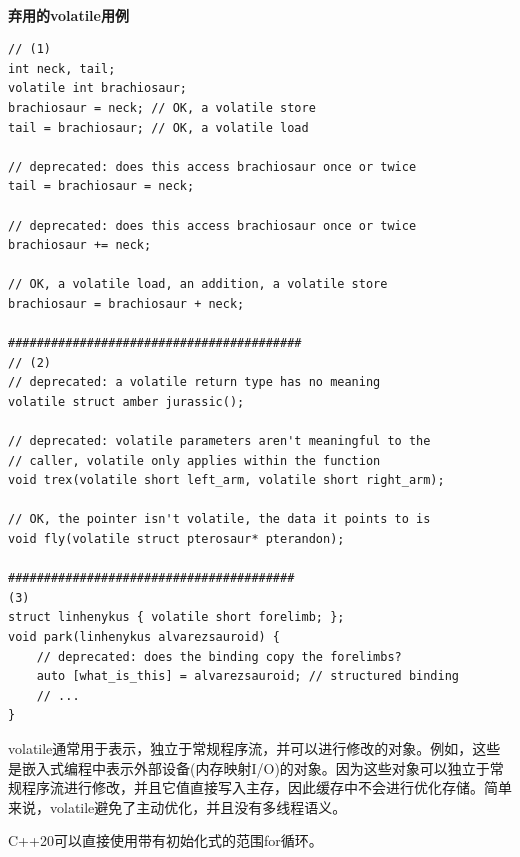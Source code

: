 \hspace*{\fill} \\ %
\noindent
\textbf{弃用的volatile用例}
\begin{lstlisting}[style=styleCXX]
// (1)
int neck, tail;
volatile int brachiosaur;
brachiosaur = neck; // OK, a volatile store
tail = brachiosaur; // OK, a volatile load

// deprecated: does this access brachiosaur once or twice
tail = brachiosaur = neck;

// deprecated: does this access brachiosaur once or twice
brachiosaur += neck;

// OK, a volatile load, an addition, a volatile store
brachiosaur = brachiosaur + neck;

#########################################
// (2)
// deprecated: a volatile return type has no meaning
volatile struct amber jurassic();

// deprecated: volatile parameters aren't meaningful to the
// caller, volatile only applies within the function
void trex(volatile short left_arm, volatile short right_arm);

// OK, the pointer isn't volatile, the data it points to is
void fly(volatile struct pterosaur* pterandon);

########################################
(3)
struct linhenykus { volatile short forelimb; };
void park(linhenykus alvarezsauroid) {
	// deprecated: does the binding copy the forelimbs?
	auto [what_is_this] = alvarezsauroid; // structured binding
	// ...
}
\end{lstlisting}

\begin{tcolorbox}[breakable,enhanced jigsaw,colback=red!5!white,colframe=red!75!black,title={volatile和多线程语义}]
volatile通常用于表示，独立于常规程序流，并可以进行修改的对象。例如，这些是嵌入式编程中表示外部设备(内存映射I/O)的对象。因为这些对象可以独立于常规程序流进行修改，并且它值直接写入主存，因此缓存中不会进行优化存储。简单来说，volatile避免了主动优化，并且没有多线程语义。
\end{tcolorbox}


C++20可以直接使用带有初始化式的范围for循环。

